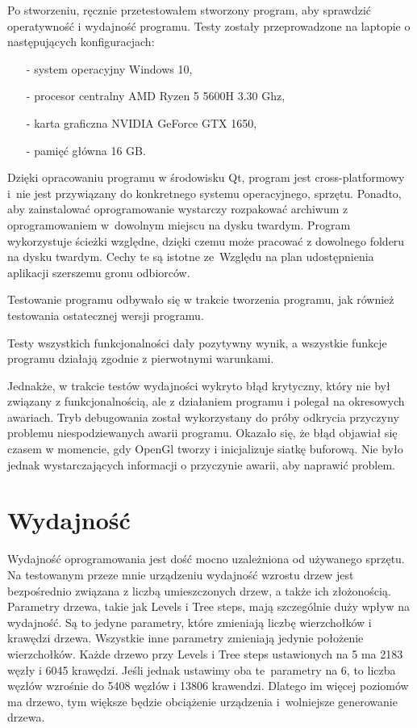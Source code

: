\documentclass[a4paper,twoside,12pt]{report}
\begin{document}
Po stworzeniu, ręcznie przetestowałem stworzony program, 
aby sprawdzić operatywność i wydajność programu. 
Testy zostały przeprowadzone na laptopie o 
następujących konfiguracjach:
\begin{itemize}
	\item[-] system operacyjny Windows 10,
	\item[-] procesor centralny AMD Ryzen 5 5600H 3.30 Ghz,
	\item[-] karta graficzna NVIDIA GeForce GTX 1650,
	\item[-] pamięć główna 16 GB. 
\end{itemize}

Dzięki opracowaniu programu w środowisku Qt, 
program jest cross-platformowy i~nie jest przywiązany 
do konkretnego systemu operacyjnego, sprzętu. 
Ponadto, aby zainstalować oprogramowanie wystarczy 
rozpakować archiwum z oprogramowaniem w~dowolnym miejscu 
na dysku twardym. Program wykorzystuje ścieżki względne, 
dzięki czemu może pracować z dowolnego folderu 
na dysku twardym. Cechy te są istotne ze~Względu na plan 
udostępnienia aplikacji szerszemu gronu odbiorców.

Testowanie programu odbywało się w trakcie tworzenia programu, 
jak również testowania ostatecznej wersji programu. 

Testy wszystkich funkcjonalności dały pozytywny wynik, 
a wszystkie funkcje programu działają zgodnie z pierwotnymi 
warunkami. 

Jednakże, w trakcie testów wydajności wykryto błąd krytyczny, 
który nie był związany z funkcjonalnością, ale z 
działaniem programu i polegał na okresowych awariach.  
Tryb debugowania został wykorzystany do próby odkrycia 
przyczyny problemu niespodziewanych awarii programu. 
Okazało się, że błąd objawiał się czasem w momencie, 
gdy OpenGl tworzy i inicjalizuje siatkę buforową. 
Nie było jednak wystarczających informacji o przyczynie awarii, 
aby naprawić problem. 

\section{Wydajność}

Wydajność oprogramowania jest dość mocno uzależniona 
od używanego sprzętu. Na testowanym przeze mnie 
urządzeniu wydajność wzrostu drzew jest bezpośrednio 
związana z liczbą umieszczonych drzew, a także ich 
złożonością. Parametry drzewa, takie jak Levels i Tree steps, 
mają szczególnie duży wpływ na wydajność.
Są to jedyne parametry, które zmieniają liczbę wierzchołków i 
krawędzi drzewa. Wszystkie inne parametry zmieniają jedynie 
położenie wierzchołków. Każde drzewo przy Levels i Tree steps 
ustawionych na 5 ma 2183 węzły i 6045 krawędzi. 
Jeśli jednak ustawimy oba te~parametry na 6, 
to liczba węzłów wzrośnie do 5408 węzłów i 13806 krawendzi. 
Dlatego im więcej poziomów ma drzewo, tym większe będzie obciążenie urządzenia 
i~wolniejsze generowanie drzewa.
\end{document}
